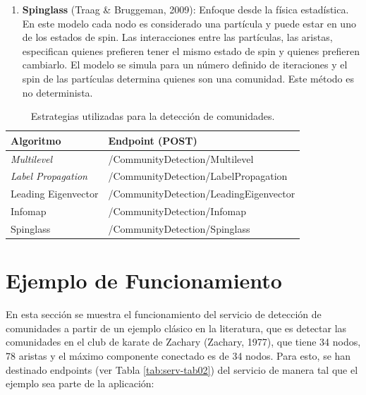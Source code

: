 \begin{enumerate}[I]
  \item \textbf{Spinglass} (Traag \& Bruggeman, 2009): Enfoque desde la física estadística. En este modelo cada nodo es considerado una partícula y puede estar en uno de los estados de spin. Las interacciones entre las partículas, las aristas, especifican quienes prefieren tener el mismo estado de spin y quienes prefieren cambiarlo. El modelo se simula para un número definido de iteraciones y el spin de las partículas determina quienes son una comunidad. Este método es no determinista.
\end{enumerate}

\begin{table}
  \begin{center}
    \caption[Estrategias utilizadas para la detección de comunidades.]{Estrategias utilizadas para la detección de comunidades.}
    \label{tab:serv-tab01}
      \begin{tabular}{|L{6cm}|L{5cm}|}
        \hline
        \textbf{Algoritmo} & \textbf{Endpoint (POST)}\\ \hline
         \textit{Multilevel} &  /CommunityDetection/Multilevel \\ \hline
         \textit{Label Propagation} & /CommunityDetection/LabelPropagation \\ \hline
         Leading Eigenvector & /CommunityDetection/LeadingEigenvector \\ \hline
         Infomap  & /CommunityDetection/Infomap \\ \hline
         Spinglass & /CommunityDetection/Spinglass \\ \hline
      \end{tabular}
  \end{center}
\end{table}

\section{Ejemplo de Funcionamiento}

En esta sección se muestra el funcionamiento del servicio de detección de comunidades a partir de un ejemplo clásico en la literatura, que es detectar las comunidades en el club de karate de Zachary (Zachary, 1977), que tiene 34 nodos, 78 aristas y el máximo componente conectado es de 34 nodos. Para esto, se han destinado endpoints (ver Tabla \ref{tab:serv-tab02})  del servicio de manera tal que el ejemplo sea parte de la aplicación:

